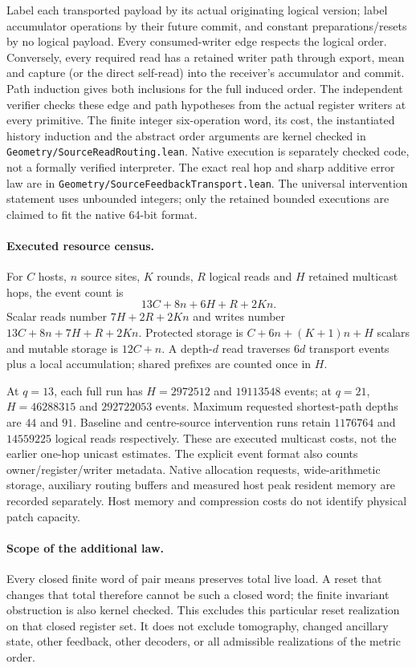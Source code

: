 Label each transported payload by its actual originating logical version;
label accumulator operations by their future commit, and constant
preparations/resets by no logical payload.  Every consumed-writer edge
respects the logical order.  Conversely, every required read has a retained
writer path through export, mean and capture (or the direct self-read) into
the receiver's accumulator and commit.  Path induction gives both
inclusions for the full induced order.  The independent verifier checks
these edge and path hypotheses from the actual register writers at every
primitive. The finite integer six-operation word, its cost, the instantiated
history induction and the abstract order arguments are kernel checked in
\texttt{Geometry/SourceReadRouting.lean}. Native execution is separately
checked code, not a formally verified interpreter. The exact real hop and sharp
additive error law are in \texttt{Geometry/SourceFeedbackTransport.lean}.
The universal intervention statement uses unbounded integers; only the
retained bounded executions are claimed to fit the native 64-bit format.

\paragraph{Executed resource census.}
For $C$ hosts, $n$ source sites, $K$ rounds, $R$ logical reads and $H$ retained
multicast hops, the event count is
\[
  13C+8n+6H+R+2Kn.
\]
Scalar reads number $7H+2R+2Kn$ and writes number
$13C+8n+7H+R+2Kn$.  Protected storage is
$C+6n+(K+1)n+H$ scalars and mutable storage is $12C+n$.
A depth-$d$ read traverses $6d$ transport events plus a local accumulation;
shared prefixes are counted once in $H$.

At $q=13$, each full run has $H=2972512$ and $19113548$ events; at $q=21$,
$H=46288315$ and $292722053$ events.  Maximum requested shortest-path depths
are $44$ and $91$.  Baseline and centre-source intervention runs retain
$1176764$ and $14559225$ logical reads respectively.  These are executed
multicast costs, not the earlier one-hop unicast estimates.  The explicit
event format also counts owner/register/writer metadata.  Native allocation
requests, wide-arithmetic storage, auxiliary routing buffers and measured
host peak resident memory are recorded separately.  Host memory and
compression costs do not identify physical patch capacity.

\paragraph{Scope of the additional law.}
Every closed finite word of pair means preserves total live load.  A reset
that changes that total therefore cannot be such a closed word; the finite
invariant obstruction is also kernel checked.  This excludes this particular
reset realization on that closed register set.  It does not exclude
tomography, changed ancillary state, other feedback, other decoders, or all
admissible realizations of the metric order.


